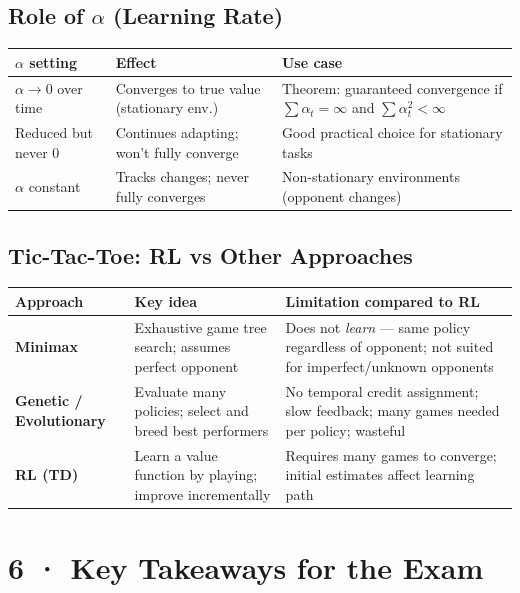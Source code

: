 \documentclass[11pt,a4paper]{article}
\begin{document}
\subsection*{Role of $\alpha$ (Learning Rate)}
\begin{center}
\begin{tabular}{p{4cm}p{5.5cm}p{5cm}}
\toprule
\textbf{$\alpha$ setting} & \textbf{Effect} & \textbf{Use case} \\
\midrule
$\alpha \to 0$ over time & Converges to true value (stationary env.) & Theorem: guaranteed convergence if $\sum \alpha_t = \infty$ and $\sum \alpha_t^2 < \infty$ \\
Reduced but never 0 & Continues adapting; won't fully converge & Good practical choice for stationary tasks \\
$\alpha$ constant & Tracks changes; never fully converges & Non-stationary environments (opponent changes) \\
\bottomrule
\end{tabular}
\end{center}

\subsection*{Tic-Tac-Toe: RL vs Other Approaches}
\begin{center}
\begin{tabular}{p{3.5cm}p{5cm}p{5.5cm}}
\toprule
\textbf{Approach} & \textbf{Key idea} & \textbf{Limitation compared to RL} \\
\midrule
\textbf{Minimax} & Exhaustive game tree search; assumes perfect opponent & Does not \emph{learn} — same policy regardless of opponent; not suited for imperfect/unknown opponents \\
\textbf{Genetic / Evolutionary} & Evaluate many policies; select and breed best performers & No temporal credit assignment; slow feedback; many games needed per policy; wasteful \\
\textbf{RL (TD)} & Learn a value function by playing; improve incrementally & Requires many games to converge; initial estimates affect learning path \\
\bottomrule
\end{tabular}
\end{center}

\section*{6 · Key Takeaways for the Exam}
\end{document}
